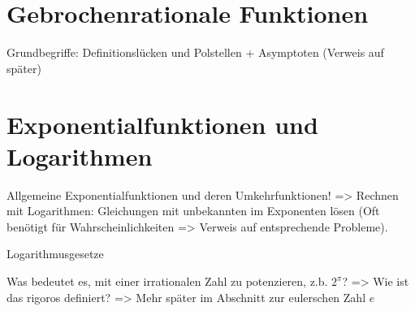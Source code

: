 \begin{theorem}
    
\end{theorem}

\begin{theorem}[pq-Formel]
    
\end{theorem}

\begin{theorem}
    
\end{theorem}

\begin{theorem}[Polynomdivision]
    
\end{theorem}


\section{Gebrochenrationale Funktionen}

\begin{definition}
    
\end{definition}

Grundbegriffe: Definitionslücken und Polstellen + Asymptoten (Verweis auf später)

\begin{definition}
    
\end{definition}

\begin{definition}[Polstelle]
    
\end{definition}

\section{Exponentialfunktionen und Logarithmen}
Allgemeine Exponentialfunktionen und deren Umkehrfunktionen!
=> Rechnen mit Logarithmen: Gleichungen mit unbekannten im Exponenten lösen (Oft benötigt für Wahrscheinlichkeiten => Verweis auf entsprechende Probleme). 

Logarithmusgesetze

Was bedeutet es, mit einer irrationalen Zahl zu potenzieren, z.b. \(2^\pi\)? => Wie ist das rigoros definiert? => Mehr später im Abschnitt zur eulerschen Zahl \(e\)

